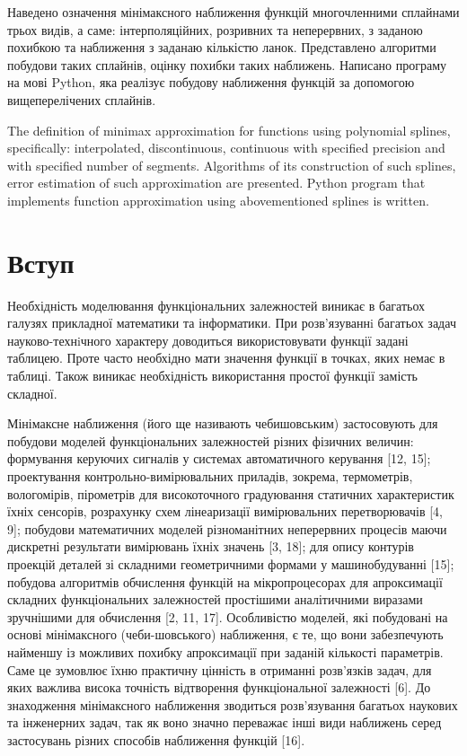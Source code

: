 \documentclass[ukrainian,14pt]{extarticle}
\begin{document}
Наведено означення мінімаксного наближення функцій многочленними сплайнами трьох видів, а саме:
інтерполяційних, розривних та неперервних, з заданою похибкою та наближення з заданаю кількістю ланок.
Представлено алгоритми побудови таких сплайнів, оцінку похибки таких наближень.
Написано програму на мові Python, яка реалізує побудову наближення функцій за допомогою вищеперелічених сплайнів.

\vspace{1cm}

The definition of minimax approximation for functions using polynomial splines, specifically:
interpolated, discontinuous, continuous with specified precision and with specified number of segments.
Algorithms of its construction of such splines, error estimation of such approximation are presented.
Python program that implements function approximation using abovementioned splines is written.
\thispagestyle{empty}

\newpage
\tableofcontents
\newpage


\section*{Вступ}
\thispagestyle{empty}


Необхідність моделювання функціональних залежностей виникає в багатьох галузях прикладної математики та інформатики.
При розв’язуваннi багатьох задач науково-технiчного характеру доводиться використовувати функції задані таблицею.
Проте часто необхідно мати значення функції в точках, яких немає в таблиці.
Також виникає необхідність використання простої функції замість складної.

Мінімаксне наближення (його ще називають чебишовським) застосовують для побудови
моделей функціональних залежностей різних фізичних величин: 
формування керуючих сигналів у системах автоматичного керування [12, 15];
проектування контрольно-вимірювальних приладів, зокрема, термометрів, вологомірів, 
пірометрів для високоточного градуювання статичних характеристик їхніх сенсорів, 
розрахунку схем лінеаризації вимірювальних перетворювачів [4, 9]; 
побудови математичних моделей різноманітних неперервних процесів 
маючи дискретні результати вимірювань їхніх значень [3, 18];
для опису контурів проекцій деталей зі складними геометричними формами у машинобудуванні [15]; 
побудова алгоритмів обчислення функцій на мікропроцесорах для апроксимації складних функціональних
залежностей простішими аналітичними виразами зручнішими для обчислення [2, 11, 17].
Особливістю моделей, які побудовані на основі мінімаксного (чеби-шовського) наближення, є те, що вони
забезпечують найменшу із можливих похибку апроксимації при заданій кількості параметрів. 
Саме це зумовлює їхню практичну цінність в отриманні розв’язків задач, 
для яких важлива висока точність відтворення функціональної залежності [6]. 
До знаходження мінімаксного наближення зводиться розв’язування багатьох наукових та інженерних задач, 
так як воно значно переважає інші види наближень серед застосувань різних способів наближення функцій [16].
\end{document}
